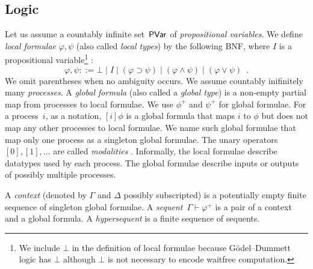 \subsection{Logic}

\newcommand{\m}[1]{{#1}^+}

Let us assume a countably infinite set~$\mathsf{PVar}$ of \textit{propositional
variables}.  We define \textit{local
formulae}
$\varphi, \psi$ (also called \textit{local types}) by the following BNF, where $I$ is a propositional
variable\footnote{We include $\bot$ in the definition of local formulae
because G\"odel--Dummett logic has
$\bot$ although $\bot$ is not necessary to encode waitfree computation.}%
:
\[
 \varphi,\psi ::= \bot \mid I \mid (\varphi\supset\psi) \mid (\varphi\wedge\psi) \mid
 (\varphi\vee\psi)\enspace.
\]
We omit parentheses when no ambiguity occurs.
We assume countably inifinitely many \textit{processes}.
A \textit{global formula}
(also called a \textit{global type})
is a non-empty partial map from processes to local
formulae.
We use $\m\phi$ and $\m\psi$ for global formulae.  For a process~$i$,
as a notation, $[i]\phi$ is a global formula that maps $i$ to $\phi$ but
does not map any other processes to local formulae.
We name such global formulae that map only one process as a singleton
global formulae.
The unary operators $[0], [1],\ldots$ are called \textit{modalities}%
.
Informally, the local formulae describe datatypes used by each process.
The global formulae describe inputs or outputs of possibly multiple
processes.

A \textit{context} (denoted by $\Gamma$ and $\Delta$ possibly
subscripted) is a potentially empty
finite sequence of singleton global formulae.
A \textit{sequent}~$\Gamma\vdash\m\varphi$ is a pair of a
context and a
global formula.
A \textit{hypersequent} is a finite sequence of sequents.

